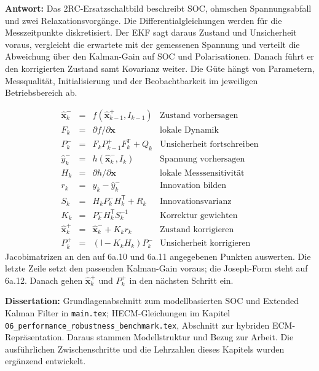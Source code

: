 \textbf{Antwort:} Das 2RC-Ersatzschaltbild beschreibt SOC, ohmschen Spannungsabfall und zwei Relaxationsvorgänge. Die Differentialgleichungen werden für die Messzeitpunkte diskretisiert. Der EKF sagt daraus Zustand und Unsicherheit voraus, vergleicht die erwartete mit der gemessenen Spannung und verteilt die Abweichung über den Kalman-Gain auf SOC und Polarisationen. Danach führt er den korrigierten Zustand samt Kovarianz weiter. Die Güte hängt von Parametern, Messqualität, Initialisierung und der Beobachtbarkeit im jeweiligen Betriebsbereich ab.

\[
\begin{array}{rcll}
\hat{\mathbf x}_k^-&=&f(\hat{\mathbf x}_{k-1}^+,I_{k-1})&\text{Zustand vorhersagen}\\[3pt]
F_k&=&\partial f/\partial\mathbf x&\text{lokale Dynamik}\\[3pt]
P_k^-&=&F_kP_{k-1}^+F_k^{\mathsf T}+Q_k&\text{Unsicherheit fortschreiben}\\[3pt]
\hat y_k^-&=&h(\hat{\mathbf x}_k^-,I_k)&\text{Spannung vorhersagen}\\[3pt]
H_k&=&\partial h/\partial\mathbf x&\text{lokale Messsensitivität}\\[3pt]
r_k&=&y_k-\hat y_k^-&\text{Innovation bilden}\\[3pt]
S_k&=&H_kP_k^-H_k^{\mathsf T}+R_k&\text{Innovationsvarianz}\\[3pt]
K_k&=&P_k^-H_k^{\mathsf T}S_k^{-1}&\text{Korrektur gewichten}\\[3pt]
\hat{\mathbf x}_k^+&=&\hat{\mathbf x}_k^-+K_kr_k&\text{Zustand korrigieren}\\[3pt]
P_k^+&=&(\mathsf I-K_kH_k)P_k^-&\text{Unsicherheit korrigieren}
\end{array}
\]
Jacobimatrizen an den auf 6a.10 und 6a.11 angegebenen Punkten auswerten. Die letzte Zeile setzt den passenden Kalman-Gain voraus; die Joseph-Form steht auf 6a.12. Danach gehen $\hat{\mathbf x}_k^+$ und $P_k^+$ in den nächsten Schritt ein.

\textbf{Dissertation:} Grundlagenabschnitt zum modellbasierten SOC und Extended Kalman Filter in \texttt{main.tex}; HECM-Gleichungen im Kapitel \texttt{06\_performance\_robustness\_benchmark.tex}, Abschnitt zur hybriden ECM-Repräsentation. Daraus stammen Modellstruktur und Bezug zur Arbeit. Die ausführlichen Zwischenschritte und die Lehrzahlen dieses Kapitels wurden ergänzend entwickelt.

